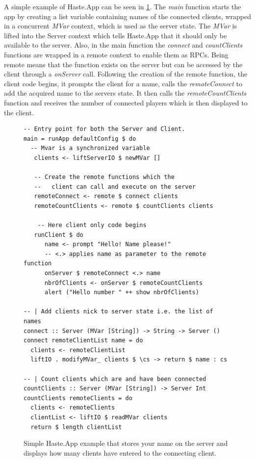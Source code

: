 \documentclass[a4paper]{article}
\begin{document}
A simple example of Haste.App can be seen in \cref{fig:haste-app-example}. The \textit{main} function starts the app by creating a list variable containing names of the connected clients, wrapped in a concurrent \textit{MVar} context, which is used as the server state. The \textit{MVar} is lifted into the Server context which tells Haste.App that it should only be available to the server. Also, in the main function the \textit{connect} and \textit{countClients} functions are wrapped in a remote context to enable them as RPCs. Being remote means that the function exists on the server but can be accessed by the client through a \textit{onServer} call. Following the creation of the remote function, the client code begins, it prompts the client for a name, calls the \textit{remoteConnect} to add the acquired name to the servers state. It then calls the \textit{remoteCountClients} function and receives the number of connected players which is then displayed to the client. 
\begin{figure}[h]
    \centering  
\begin{lstlisting}  
-- Entry point for both the Server and Client.
main = runApp defaultConfig $ do
  -- Mvar is a synchronized variable
   clients <- liftServerIO $ newMVar []

   -- Create the remote functions which the
   --   client can call and execute on the server
   remoteConnect <- remote $ connect clients
   remoteCountClients <- remote $ countClients clients

    -- Here client only code begins
   runClient $ do
      name <- prompt "Hello! Name please!"
      -- <.> applies name as parameter to the remote function
      onServer $ remoteConnect <.> name
      nbrOfClients <- onServer $ remoteCountClients
      alert ("Hello number " ++ show nbrOfClients)

-- | Add clients nick to server state i.e. the list of names
connect :: Server (MVar [String]) -> String -> Server ()
connect remoteClientList name = do
  clients <- remoteClientList
  liftIO . modifyMVar_ clients $ \cs -> return $ name : cs

-- | Count clients which are and have been connected
countClients :: Server (MVar [String]) -> Server Int
countClients remoteClients = do
  clients <- remoteClients
  clientList <- liftIO $ readMVar clients
  return $ length clientList
\end{lstlisting}
    \caption{Simple Haste.App example that stores your name on the server and displays how many clients have entered to the connecting client.}
    \label{fig:haste-app-example}
\end{figure}
\end{document}
